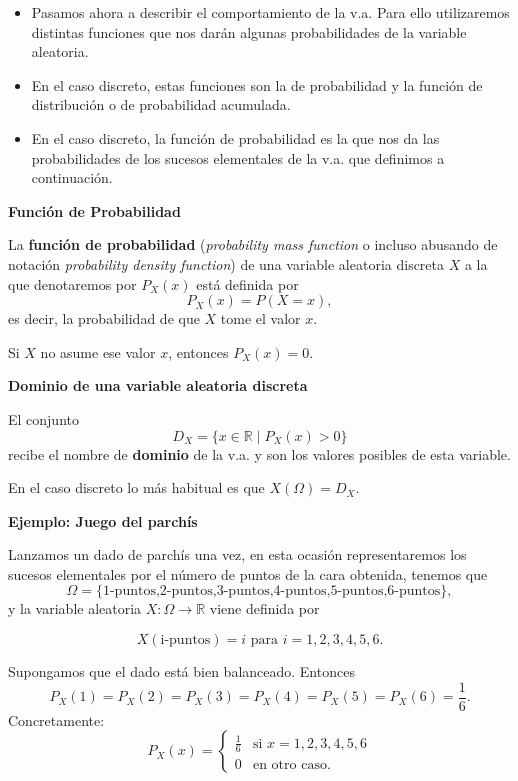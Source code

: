 \documentclass[
  letterpaper,
  DIV=11,
  numbers=noendperiod]{scrreprt}
\providecommand{\tightlist}{%
  \setlength{\itemsep}{0pt}\setlength{\parskip}{0pt}}\usepackage{longtable,booktabs,array}
\begin{document}
\begin{itemize}
\tightlist
\item
  Pasamos ahora a describir el comportamiento de la v.a. Para ello
  utilizaremos distintas funciones que nos darán algunas probabilidades
  de la variable aleatoria.
\item
  En el caso discreto, estas funciones son la de probabilidad y la
  función de distribución o de probabilidad acumulada.
\item
  En el caso discreto, la función de probabilidad es la que nos da las
  probabilidades de los sucesos elementales de la v.a. que definimos a
  continuación.
\end{itemize}

\textbf{Función de Probabilidad}

La \textbf{función de probabilidad} (\emph{probability mass function} o
incluso abusando de notación \emph{probability density function}) de una
variable aleatoria discreta \(X\) a la que denotaremos por \(P_{X}(x)\)
está definida por \[P_{X}(x)=P(X=x),\] es decir, la probabilidad de que
\(X\) tome el valor \(x\).

Si \(X\) no asume ese valor \(x\), entonces \(P_{X}(x)=0\).

\textbf{Dominio de una variable aleatoria discreta}

El conjunto \[D_X=\{ x\in\mathbb{R} \mid P_X(x)>0\}\] recibe el nombre
de \textbf{dominio} de la v.a. y son los valores posibles de esta
variable.

En el caso discreto lo más habitual es que \(X(\Omega)=D_X\).

\textbf{Ejemplo: Juego del parchís}

Lanzamos un dado de parchís una vez, en esta ocasión representaremos los
sucesos elementales por el número de puntos de la cara obtenida, tenemos
que
\[\Omega=\{\mbox{1-puntos,2-puntos,3-puntos,4-puntos,5-puntos,6-puntos}\},\]
y la variable aleatoria \(X:\Omega\to \mathbb{R}\) viene definida por

\[X(\mbox{i-puntos})=i\mbox{ para } i=1,2,3,4,5,6.\]

Supongamos que el dado está bien balanceado. Entonces
\[P_{X}(1)=P_{X}(2)=P_{X}(3)=P_{X}(4)=P_{X}(5)=P_{X}(6)=\frac16.\]
Concretamente: \[
P_{X}(x)=
  \left\{
  \begin{array}{ll}
   \frac16 & \mbox{si } x=1,2,3,4,5,6\\
  0 & \mbox{en otro caso. }
  \end{array}
  \right.
\]
\end{document}
